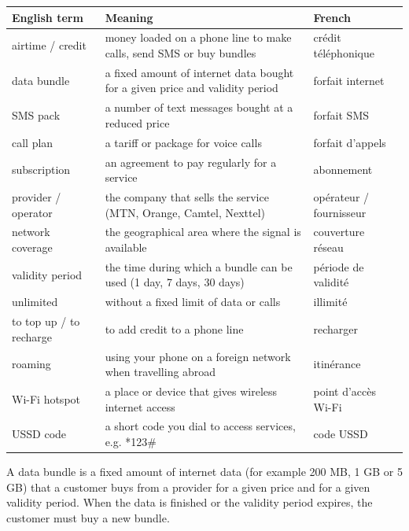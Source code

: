 \documentclass[11pt]{article}
\newcommand{\cle}[1]{{\popxbold\color{popdark}#1}}
\begin{document}
\begin{center}
\begin{tabularx}{\linewidth}{|l|X|l|}\hline
\rowcolor{popblueL} \textbf{English term} & \textbf{Meaning} & \textbf{French} \\ \hline
airtime / credit & money loaded on a phone line to make calls, send SMS or buy bundles & crédit téléphonique \\ \hline
data bundle & a fixed amount of internet data bought for a given price and validity period & forfait internet \\ \hline
SMS pack & a number of text messages bought at a reduced price & forfait SMS \\ \hline
call plan & a tariff or package for voice calls & forfait d'appels \\ \hline
subscription & an agreement to pay regularly for a service & abonnement \\ \hline
provider / operator & the company that sells the service (MTN, Orange, Camtel, Nexttel) & opérateur / fournisseur \\ \hline
network coverage & the geographical area where the signal is available & couverture réseau \\ \hline
validity period & the time during which a bundle can be used (1 day, 7 days, 30 days) & période de validité \\ \hline
unlimited & without a fixed limit of data or calls & illimité \\ \hline
to top up / to recharge & to add credit to a phone line & recharger \\ \hline
roaming & using your phone on a foreign network when travelling abroad & itinérance \\ \hline
Wi-Fi hotspot & a place or device that gives wireless internet access & point d'accès Wi-Fi \\ \hline
USSD code & a short code you dial to access services, e.g. *123\# & code USSD \\ \hline
\end{tabularx}
\end{center}

\begin{definition}
A \cle{data bundle} is a fixed amount of internet data (for example 200 MB, 1 GB or 5 GB) that a customer buys from a provider for a given price and for a given validity period. When the data is finished or the validity period expires, the customer must buy a new bundle.
\end{definition}
\end{document}
